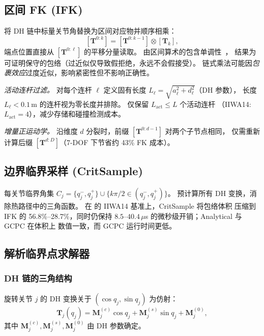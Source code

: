 \documentclass[journal]{IEEEtran}
\newcommand{\bT}{\mathbf{T}}
\begin{document}
\subsection{区间 FK (IFK)}\label{sec:ifk}

将 DH 链中标量关节角替换为区间对应物并顺序相乘：
\begin{equation}\label{eq:chain}
  [\bT^{0:k}] = [\bT^{0:k-1}] \otimes [\bT_k],
\end{equation}
端点位置直接从 $[\bT^{0:\ell}]$ 的平移分量读取。
由区间算术的包含单调性~\cite{moore2009introduction}，
结果为可证明保守的包络（过近似仅导致假拒绝，永远不会假接受）。
链式乘法可能因\emph{包裹效应}过度近似，影响紧密性但不影响正确性。

\emph{活动连杆过滤。}
对每个连杆 $\ell$ 定义固有长度
$L_\ell = \sqrt{a_\ell^2 + d_\ell^2}$（DH 参数），
长度 $L_\ell < 0.1\,$m 的连杆视为零长度并排除。
仅保留 $L_\text{act} \leq L$ 个活动连杆
（IIWA14: $L_\text{act} = 4$），减少存储和碰撞检测成本。

\emph{增量正运动学。}
沿维度 $d$ 分裂时，前缀 $[\bT^{0:d-1}]$ 对两个子节点相同，
仅需重新计算后缀 $[\bT^{d:D}]$（7-DOF 下节省约 43\% FK 成本）。

\subsection{边界临界采样 (CritSample)}\label{sec:critsample}

每关节临界角集
$C_j = \{q_j^-, q_j^+\} \cup \{k\pi/2 \in (q_j^-, q_j^+)\}$。
预计算所有 DH 变换，消除热路径中的三角函数。
在  的 IIWA14 基准上，CritSample 将包络体积
压缩到 IFK 的 56.8\%--28.7\%，同时仍保持
$8.5$--$40.4\,\mu$s 的微秒级开销；Analytical 与 GCPC 在体积上
数值一致，而 GCPC 运行时间更低。

\subsection{解析临界点求解器}\label{sec:analytical}

\subsubsection{DH 链的三角结构}

旋转关节 $j$ 的 DH 变换关于 $(\cos q_j, \sin q_j)$ 为仿射：
\begin{equation}\label{eq:dh_affine}
  \bT_j(q_j) = \bm{M}_j^{(c)}\cos q_j + \bm{M}_j^{(s)}\sin q_j + \bm{M}_j^{(0)},
\end{equation}
其中 $\bm{M}_j^{(c)}, \bm{M}_j^{(s)}, \bm{M}_j^{(0)}$ 由 DH 参数确定。
\end{document}
